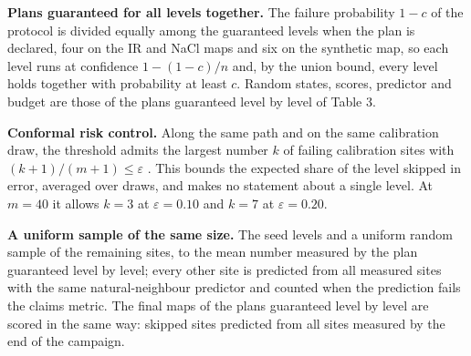 \documentclass{iopjournal}
\begin{document}
\textbf{Plans guaranteed for all levels together.} The failure probability \(1 - c\) of the protocol is divided equally among the guaranteed levels when the plan is declared, four on the IR and NaCl maps and six on the synthetic map, so each level runs at confidence \(1 - (1 - c)/n\) and, by the union bound, every level holds together with probability at least \(c\). Random states, scores, predictor and budget are those of the plans guaranteed level by level of Table 3.

\textbf{Conformal risk control.} Along the same path and on the same calibration draw, the threshold admits the largest number \(k\) of failing calibration sites with \((k + 1)/(m + 1) \le \varepsilon\) \cite{Angelopoulos2024}. This bounds the expected share of the level skipped in error, averaged over draws, and makes no statement about a single level. At \(m = 40\) it allows \(k = 3\) at \(\varepsilon = 0.10\) and \(k = 7\) at \(\varepsilon = 0.20\).

\textbf{A uniform sample of the same size.} The seed levels and a uniform random sample of the remaining sites, to the mean number measured by the plan guaranteed level by level; every other site is predicted from all measured sites with the same natural-neighbour predictor and counted when the prediction fails the claim\textquotesingle s metric. The final maps of the plans guaranteed level by level are scored in the same way: skipped sites predicted from all sites measured by the end of the campaign.
\end{document}
